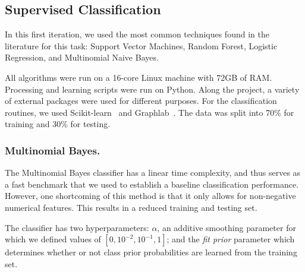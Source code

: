 \subsection{Supervised Classification}


In this first iteration, we used the most common techniques found in the literature for this task:
Support Vector Machines, Random Forest, Logistic Regression, and Multinomial Naive Bayes.

All algorithms were run on a 16-core Linux machine with 72GB of RAM.  Processing and learning scripts were run on Python. %
Along the project, a variety of external packages were used for different purposes. For the classification routines, we used Scikit-learn~\cite{sklearn} and Graphlab~\cite{graphlab}.
The data was split into 70\% for training and 30\% for testing.








\subsubsection{Multinomial Bayes.}
 
 The Multinomial Bayes classifier has a linear time complexity, and thus serves as a fast benchmark that we used to establish a baseline classification performance. However, one shortcoming of this method is that it only allows for non-negative numerical features. This results in a reduced training and testing set.
  
 The classifier has two hyperparameters: $\alpha$, an additive smoothing parameter for which we defined values of $[0,{10^{-2}},{10^{-1}},1]$; and the \textit{fit prior} parameter which determines whether or not class prior probabilities are learned from the training set. 
 
